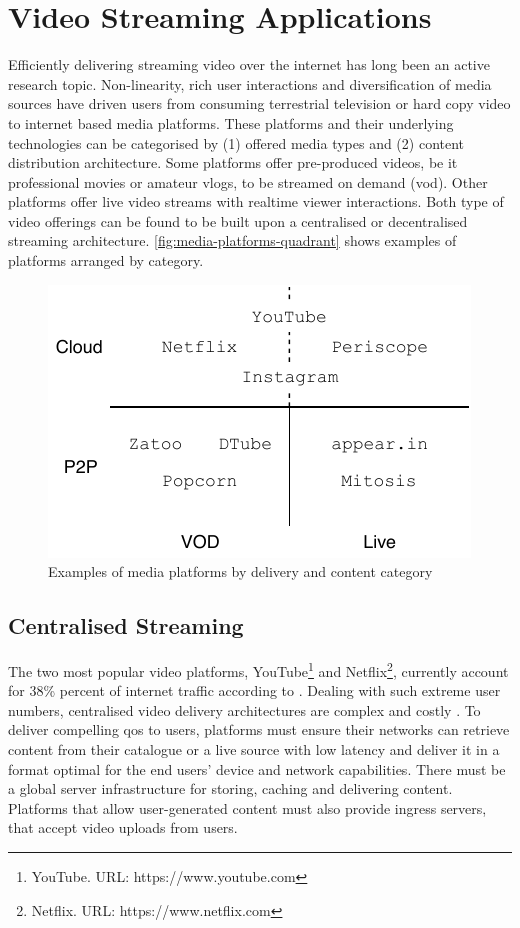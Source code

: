 \section{Video Streaming Applications}

Efficiently delivering streaming video over the internet has long been an active research topic. Non-linearity, rich user interactions and diversification of media sources have driven users from consuming terrestrial television or hard copy video to internet based media platforms.
These platforms and their underlying technologies can be categorised by (1) offered media types and (2) content distribution architecture. Some platforms offer pre-produced videos, be it professional movies or amateur vlogs, to be streamed on demand (\gls{vod}). Other platforms offer live video streams with realtime viewer interactions.
Both type of video offerings can be found to be built upon a centralised or decentralised streaming architecture. \vref{fig:media-platforms-quadrant} shows examples of platforms arranged by category.

\begin{figure}
\centering
\includegraphics[width=.75\textwidth]{graphics/media-platforms-quadrant.pdf}
\caption{Examples of media platforms by delivery and content category}
\label{fig:media-platforms-quadrant}
\end{figure}

\subsection{Centralised Streaming}

The two most popular video platforms, YouTube\footnote{\label{youtube}YouTube. URL: {https://www.youtube.com}} and Netflix\footnote{\label{netflix}Netflix. URL: {https://www.netflix.com}}, currently account for 38\% percent of internet traffic according to \citet[p. 18]{phenomena-report}. Dealing with such extreme user numbers, centralised video delivery architectures are complex and costly \cite{market-driven-p2p}. To deliver compelling \gls{qos} to users, platforms must ensure their networks can retrieve content from their catalogue or a live source with low latency and deliver it in a format optimal for the end users' device and network capabilities. There must be a global server infrastructure for storing, caching and delivering content. Platforms that allow user-generated content must also provide ingress servers, that accept video uploads from users.

